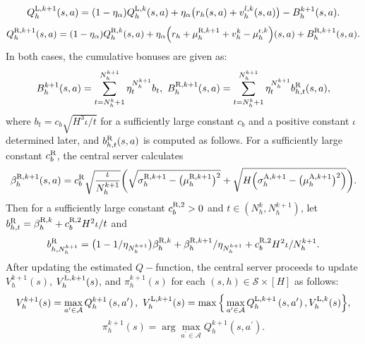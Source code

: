 \documentclass{article}
\newcommand{\LL}{\textnormal{L}}
\newcommand{\R}{\textnormal{R}}
\newcommand{\nr}{\textnormal{r}}
\newcommand{\A}{\textnormal{A}}
\begin{document}
    \begin{equation}
        \label{update_q_large_l}
        Q_h^{\LL, k+1}(s,a)= (1-\eta_{\alpha})Q_h^{\LL,k}(s,a)+\eta_{\alpha}\big(r_h(s,a)+v_{h}^{l,k}(s,a)\big) - B_h^{k+1}(s,a).
    \end{equation}
    \begin{equation}
        \label{update_q_large_r}
        Q_h^{\R, k+1}(s,a)= (1-\eta_{\alpha})Q_h^{\R,k}(s,a)+\eta_{\alpha}\Big(r_h +\mu_h^{\R,k+1}+v_{h}^{k}-\mu_{h}^{\nr,k}\Big)(s,a)+ B_h^{\R,k+1}(s,a).
    \end{equation}
In both cases, the cumulative bonuses are given as:
\begin{equation}
\label{culb}
    B_h^{k+1}(s,a) = \sum_{t = N_h^k+1}^{N_h^{k+1}}\eta_{t}^{N_h^{k+1}}b_t,\ B_h^{\R,k+1}(s,a) = \sum_{t = N_h^k+1}^{N_h^{k+1}}\eta_{t}^{N_h^{k+1}}b^{\R}_{h,t}(s,a),
\end{equation}
 where $b_t = c_b\sqrt{H^3\iota/t}$ for a sufficiently large constant $c_b$ and a positive constant $\iota$ determined later, and $b^{\R}_{h,t}(s,a)$ is computed as follows. For a sufficiently large constant $c_b^{\R}$, the central server calculates
\begin{equation*}
    \beta_{h}^{\R,k+1}(s,a) = c_b^{\R}\sqrt{\frac{\iota}{N_h^{k+1}}}\bigg(\sqrt{\sigma_h^{\R,k+1}-\big(\mu_h^{\R,k+1}\big)^2} +\sqrt{H\Big(\sigma_h^{\A,k+1}-\big(\mu_h^{\A,k+1}\big)^2\Big)}\bigg).
\end{equation*}
Then for a sufficiently large constant $c_b^{\R,2}>0$ and $t\in(N_h^k, N_h^{k+1})$, let $b_{h,t}^{\R} = \beta_{h}^{\R,k} + c_b^{\R,2}H^2\iota/t$ and
$$b_{h,N_h^{k+1}}^{\R} = \big(1-1/\eta_{N_h^{k+1}}\big)\beta_{h}^{\R,k} + \beta_{h}^{\R,k+1}/\eta_{N_h^{k+1}}+c_b^{\R,2}H^2\iota/N_h^{k+1}.$$
After updating the estimated $Q-$function, the central server proceeds to update $V_h^{k+1}(s)$, $V_h^{\LL,k+1}(s)$, and $\pi_h^{k+1}(s)$ for each $(s,h) \in \mathcal{S} \times [H]$ as follows:
\begin{equation}\label{updatev}
    V_h^{k+1}(s) = \max _{a^{\prime} \in \mathcal{A}} Q_h^{k+1}\left(s, a^{\prime}\right),\ 
    V_h^{\LL, k+1}(s) = \max\Big\{ \max _{a^{\prime} \in \mathcal{A}} Q_h^{\LL, k+1}\left(s, a^{\prime}\right), V_h^{\LL, k}(s)\Big\}, 
\end{equation}
\begin{equation}
\label{updatepolicy}
     \pi_{h}^{k+1}(s)= \arg \max_{a^{\prime} \in \mathcal{A}} Q_h^{k+1}\left(s, a^{\prime}\right). 
 \end{equation}
\end{document}
